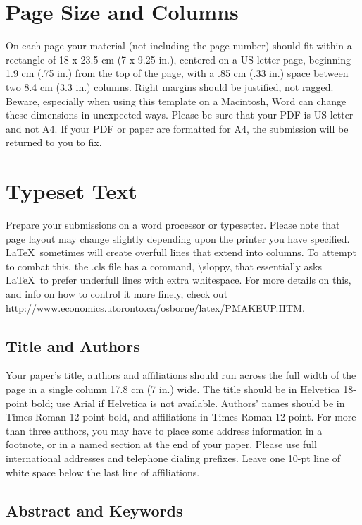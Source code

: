 \documentclass{sigchi}
\begin{document}
\section{Page Size and Columns}

On each page your material (not including the page number) should fit
within a rectangle of 18 x 23.5 cm (7 x 9.25 in.), centered on a US
letter page, beginning 1.9 cm (.75 in.) from the top of the page, with
a .85 cm (.33 in.) space between two 8.4 cm (3.3 in.) columns.  Right
margins should be justified, not ragged. Beware, especially when using
this template on a Macintosh, Word can change these dimensions in
unexpected ways. Please be sure that your PDF is US letter and not
A4. If your PDF or paper are formatted for A4, the submission will be
returned to you to fix.

\section{Typeset Text}

Prepare your submissions on a word processor or typesetter.  Please
note that page layout may change slightly depending upon the printer
you have specified.  \LaTeX\ sometimes will create overfull lines
that extend into columns.  To attempt to combat this, the .cls
file has a command, {\textbackslash}sloppy, that essentially asks
\LaTeX\ to prefer underfull lines with extra whitespace.  For more
details on this, and info on how to control it more finely, check out
{\url{http://www.economics.utoronto.ca/osborne/latex/PMAKEUP.HTM}}.

\subsection{Title and Authors}

Your paper's title, authors and affiliations should run across the
full width of the page in a single column 17.8 cm (7 in.) wide.  The
title should be in Helvetica 18-point bold; use Arial if Helvetica is
not available.  Authors' names should be in Times Roman 12-point bold,
and affiliations in Times Roman 12-point.  For more than three authors,
you may have to place some address information in a footnote, or in a named
section at the end of your paper. Please use full international addresses and
telephone dialing prefixes.  Leave one 10-pt line of white space below the last
line of affiliations.

\subsection{Abstract and Keywords}
\end{document}
